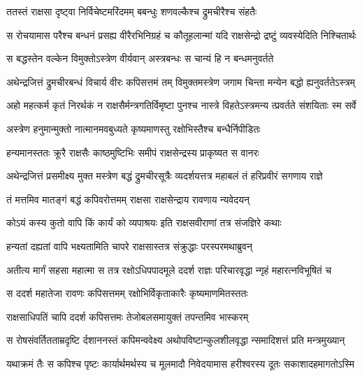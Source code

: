 \twolineshloka
{ततस्तं राक्षसा दृष्ट्वा निर्विचेष्टमरिंदमम्}
{बबन्धुः शणवल्कैश्च द्रुमचीरैश्च संहतैः} %

\fourlineindentedshloka
{स रोचयामास परैश्च बन्धनं}
{ प्रसह्य वीरैरभिनिग्रहं च}
{कौतूहलान्मां यदि राक्षसेन्द्रो}
{ द्रष्टुं व्यवस्येदिति निश्चितार्थः} %

\twolineshloka
{स बद्धस्तेन वल्केन विमुक्तोऽस्त्रेण वीर्यवान्}
{अस्त्रबन्धः स चान्यं हि न बन्धमनुवर्तते} %

\fourlineindentedshloka
{अथेन्द्रजित्तं द्रुमचीरबन्धं}
{ विचार्य वीरः कपिसत्तमं तम्}
{विमुक्तमस्त्रेण जगाम चिन्ता}
{मन्येन बद्धो ह्यनुवर्ततेऽस्त्रम्} %

\fourlineindentedshloka
{अहो महत्कर्म कृतं निरर्थकं}
{ न राक्षसैर्मन्त्रगतिर्विमृष्टा}
{पुनश्च नास्त्रे विहतेऽस्त्रमन्य}
{त्प्रवर्तते संशयिताः स्म सर्वे} %

\twolineshloka
{अस्त्रेण हनुमान्मुक्तो नात्मानमवबुध्यते}
{कृष्यमाणस्तु रक्षोभिस्तैश्च बन्धैर्निपीडितः} %

\twolineshloka
{हन्यमानस्ततः क्रूरै राक्षसैः काष्ठमुष्टिभिः}
{समीपं राक्षसेन्द्रस्य प्राकृष्यत स वानरः} %

\fourlineindentedshloka
{अथेन्द्रजित्तं प्रसमीक्ष्य मुक्त}
{मस्त्रेण बद्धं द्रुमचीरसूत्रैः}
{व्यदर्शयत्तत्र महाबलं तं}
{ हरिप्रवीरं सगणाय राज्ञे} %

\twolineshloka
{तं मत्तमिव मातङ्गं बद्धं कपिवरोत्तमम्}
{राक्षसा राक्षसेन्द्राय रावणाय न्यवेदयन्} %

\twolineshloka
{कोऽयं कस्य कुतो वापि किं कार्यं को व्यपाश्रयः}
{इति राक्षसवीराणां तत्र संजज्ञिरे कथाः} %

\twolineshloka
{हन्यतां दह्यतां वापि भक्ष्यतामिति चापरे}
{राक्षसास्तत्र संक्रुद्धाः परस्परमथाब्रुवन्} %

\fourlineindentedshloka
{अतीत्य मार्गं सहसा महात्मा}
{ स तत्र रक्षोऽधिपपादमूले}
{ददर्श राज्ञः परिचारवृद्धा}
{न्गृहं महारत्नविभूषितं च} %

\twolineshloka
{स ददर्श महातेजा रावणः कपिसत्तमम्}
{रक्षोभिर्विकृताकारैः कृष्यमाणमितस्ततः} %

\twolineshloka
{राक्षसाधिपतिं चापि ददर्श कपिसत्तमः}
{तेजोबलसमायुक्तं तपन्तमिव भास्करम्} %

\fourlineindentedshloka
{स रोषसंवर्तितताम्रदृष्टि}
{र्दशाननस्तं कपिमन्ववेक्ष्य}
{अथोपविष्टान्कुलशीलवृद्धा}
{न्समादिशत्तं प्रति मन्त्रमुख्यान्} %

\fourlineindentedshloka
{यथाक्रमं तैः स कपिश्च पृष्टः}
{ कार्यार्थमर्थस्य च मूलमादौ}
{निवेदयामास हरीश्वरस्य}
{ दूतः सकाशादहमागतोऽस्मि} %


